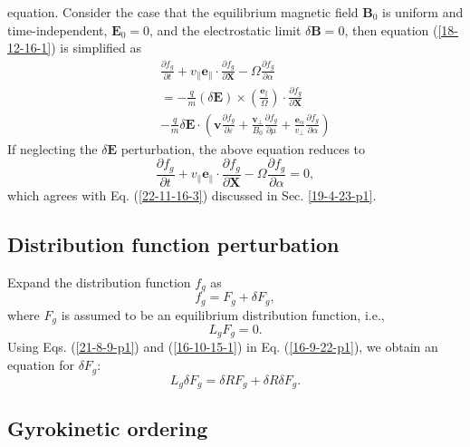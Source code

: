 \documentclass{llncs}
\newcommand{\tmmathbf}[1]{\ensuremath{\boldsymbol{#1}}}
\begin{document}
equation. Consider the case that the equilibrium magnetic field $\mathbf{B}_0$
is uniform and time-independent, $\mathbf{E}_0 = 0$, and the electrostatic
limit $\delta \mathbf{B}= 0$, then equation (\ref{18-12-16-1}) is simplified
as
\begin{eqnarray}
  &  & \frac{\partial f_g}{\partial t} + v_{\parallel} \mathbf{e}_{\parallel}
  \cdot \frac{\partial f_g}{\partial \mathbf{X}} - \Omega \frac{\partial
  f_g}{\partial \alpha} \nonumber\\
  &  & = - \frac{q}{m} (\delta \mathbf{E}) \times \left(
  \frac{\tmmathbf{e}_{\parallel}}{\Omega}  \right) \cdot \frac{\partial
  f_g}{\partial \mathbf{X}} \\
  &  & - \frac{q}{m} \delta \mathbf{E} \cdot \left( \mathbf{v} \frac{\partial
  f_g}{\partial \varepsilon} + \frac{\mathbf{v}_{\perp}}{B_0}  \frac{\partial
  f_g}{\partial \mu} + \frac{\tmmathbf{e}_{\alpha}}{v_{\perp}}  \frac{\partial
  f_g}{\partial \alpha} \right) 
\end{eqnarray}
If neglecting the $\delta \mathbf{E}$ perturbation, the above equation reduces
to
\begin{equation}
  \frac{\partial f_g}{\partial t} + v_{\parallel} \mathbf{e}_{\parallel} \cdot
  \frac{\partial f_g}{\partial \mathbf{X}} - \Omega \frac{\partial
  f_g}{\partial \alpha} = 0,
\end{equation}
which agrees with Eq. (\ref{22-11-16-3}) discussed in Sec. \ref{19-4-23-p1}.

\subsection{Distribution function perturbation}

Expand the distribution function $f_g$ as
\begin{equation}
  \label{21-8-9-p1} f_g = F_g + \delta F_g,
\end{equation}
where $F_g$ is assumed to be an equilibrium distribution function, i.e.,
\begin{equation}
  \label{16-10-15-1} L_g F_g = 0.
\end{equation}
Using Eqs. (\ref{21-8-9-p1}) and (\ref{16-10-15-1}) in Eq. (\ref{16-9-22-p1}),
we obtain an equation for $\delta F_g$:
\begin{equation}
  \label{16-9-23-p1} L_g \delta F_g = \delta R F_g + \delta R \delta F_g .
\end{equation}

\subsection{Gyrokinetic ordering}
\end{document}
